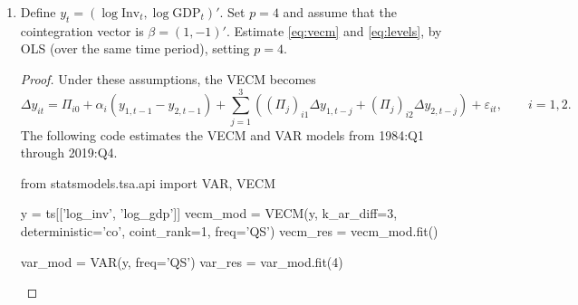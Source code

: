 \documentclass[oneside,reqno]{amsart}
\newcommand{\eps}{\varepsilon}
\theoremstyle{definition}
\begin{document}
\begin{enumerate}[label=(\roman*)]
\begin{proof}
\begin{python3code}
ax2.plot(y['log_inv'] - y['log_gdp'], 'k', label='Log Investment-GDP Ratio')
ax2.legend()

plt.show()
\end{python3code}
\end{proof}

\item
Define $y_t = (\log \text{Inv}_t, \log \text{GDP}_t)'$. Set $p=4$ and assume that the cointegration vector is $\beta=(1,-1)'$. Estimate \eqref{eq:vecm} and \eqref{eq:levels}, by OLS (over the same time period), setting $p=4$. 

\begin{proof}
Under these assumptions, the VECM becomes 
\[
	\Delta y_{it} = \Pi_{i0} + \alpha_i (y_{1,t-1} - y_{2,t-1}) + \sum_{j=1}^3 ( (\Pi_j)_{i1} \Delta y_{1,t-j} + (\Pi_j)_{i2} \Delta y_{2,t-j}) + \eps_{it},
	\qquad i=1,2.
\]
The following code estimates the VECM and VAR models from 1984:Q1 through 2019:Q4. 
\begin{python3code}
from statsmodels.tsa.api import VAR, VECM

y = ts[['log_inv', 'log_gdp']]
vecm_mod = VECM(y, k_ar_diff=3, deterministic='co', coint_rank=1, freq='QS')
vecm_res = vecm_mod.fit()

var_mod = VAR(y, freq='QS')
var_res = var_mod.fit(4)
\end{python3code}


\end{proof}
\end{enumerate}
\end{document}
